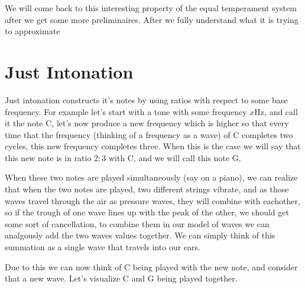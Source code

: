 We will come back to this interesting property of the equal temperament system after we get some more preliminaires. After we fully understand what it is trying to approximate

\section{Just Intonation}

Just intonation constructs it's notes by using ratios with respect to some base frequency. For example let's start with a tone with some frequency $x\text{Hz}$, and call it the note C, let's now produce a new frequency which is higher so that every time that the frequency (thinking of a frequency as a wave) of C completes two cycles, this new frequency completes three.  When this is the case we will say that this new note is in ratio $2:3$ with C, and we will call this note G.

When these two notes are played simultaneously (say on a piano), we can realize that when the two notes are played, two different strings vibrate, and as those waves travel through the air as pressure waves, they will combine with eachother,  so if the trough of one wave lines up with the peak of the other, we should get some sort of cancellation, to combine them in our model of waves we can analgously add the two waves values together. We can simply think of this summation as a single wave that travels into our ears.

Due to this we can now think of C being played with the new note, and consider that a new wave. Let's visualize C and G being played together.

\begin{center}
\end{center}
              


